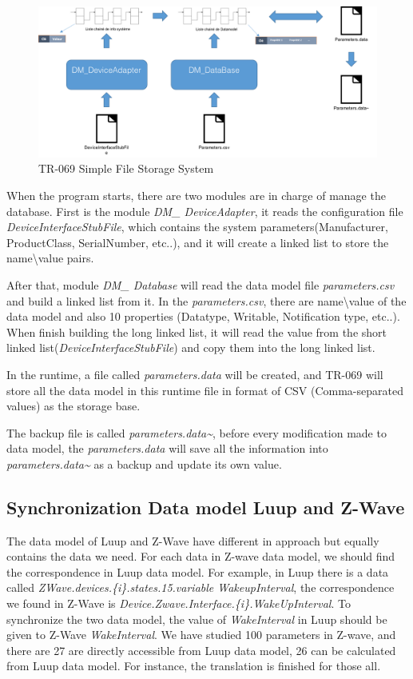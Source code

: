 \begin{figure}[htbp]
	\centering
		\includegraphics[width=14.5cm]{Figures/database}
	\caption[TR-069 Simple File Storage System]{TR-069 Simple File Storage System}
	\label{fig:database}
\end{figure}

When the program starts, there are two modules are in charge of manage the database. First is the module \textit{DM\_ DeviceAdapter}, it reads the configuration file \textit{DeviceInterfaceStubFile}, which contains the system parameters(Manufacturer, ProductClass, SerialNumber, etc..), and it will create a linked list to store the name\textbackslash value pairs.

After that, module \textit{DM\_ Database} will read the data model file \textit{parameters.csv} and build a linked list from it. In the \textit{parameters.csv}, there are name\textbackslash value of the data model and also 10 properties (Datatype, Writable, Notification type, etc..). When finish building the long linked list, it will read the value from the short linked list(\textit{DeviceInterfaceStubFile}) and copy them into the long linked list.

In the runtime, a file called \textit{parameters.data} will be created, and TR-069 will store all the data model in this runtime file in format of CSV (Comma-separated values) as the storage base.

The backup file is called \textit{parameters.data\~{}}, before every modification made to data model, the \textit{parameters.data} will save all the information into \textit{parameters.data\~{}} as a backup and update its own value.


\subsection{Synchronization Data model Luup and Z-Wave}

The data model of Luup and Z-Wave have different in approach but equally contains the data we need. For each data in Z-wave data model, we should find the correspondence in Luup data model. For example, in Luup there is a data called \textit{ZWave.devices.\{i\}.states.15.variable WakeupInterval}, the correspondence we found in Z-Wave is \textit{Device.Zwave.Interface.\{i\}.WakeUpInterval}. To synchronize the two data model, the value of \textit{WakeInterval} in Luup should be given to Z-Wave \textit{WakeInterval}. We have studied 100 parameters in Z-wave, and there are 27 are directly accessible from Luup data model, 26 can be calculated from Luup data model. For instance, the translation is finished for those all.
